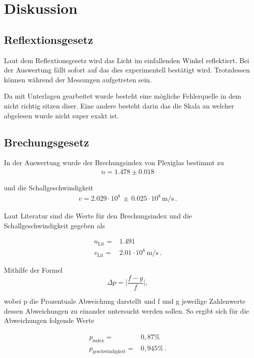 \section{Diskussion}

\subsection{Reflextionsgesetz}
Laut dem Reflextionsgesetz wird das Licht im einfallenden Winkel reflektiert. 
Bei der Auswertung fällt sofort auf das dies experimentell bestätigt wird. Trotzdessen
können während der Messungen aufgetreten sein. 

Da mit Unterlagen gearbeitet wurde besteht eine mögliche Fehlerquelle in dem nicht richtig 
sitzen diser. Eine andere besteht darin das die Skala an welcher abgelesen wurde nicht super
exakt ist.

\subsection{Brechungsgesetz}

In der Auswertung wurde der Brechungsindex von Plexiglas bestimmt zu
\begin{align*}
    n = 1.478 \pm 0.018 
\end{align*} 

und die Schallgeschwindigkeit 
\begin{align*}
    v = 2.029 \cdot 10^8 \, \pm \, 0.025 \cdot 10^8 \, \si{\meter\per\second} \, .
\end{align*}

Laut Literatur \cite{Kronglas} sind die Werte für den Brechungsindex und die Schallgeschwindigkeit
gegeben als

\begin{align*}
    n_\text{Lit} =& 1.491 \\
    v_\text{Lit} =& 2.01 \cdot 10^8 \, \si{\meter\per\second} \, .
\end{align*}

Mithilfe der Formel 
\begin{equation}
\label{eqn:o}
\Delta p = \bigg |\frac{f-g}{f} \bigg |,
\end{equation}

\noindent
wobei p die Prozentuale Abweichung darstellt und f und g jeweilige Zahlenwerte dessen Abweichungen zu einander untersucht werden sollen. So ergibt sich für die Abweichungen folgende Werte

\begin{align*}
    p_\text{index} =&  0,87 \si{\percent}   \\
    p_\text{geschwindigkeit} =& 0,945 \si{\percent}  \, .\\
\end{align*}


